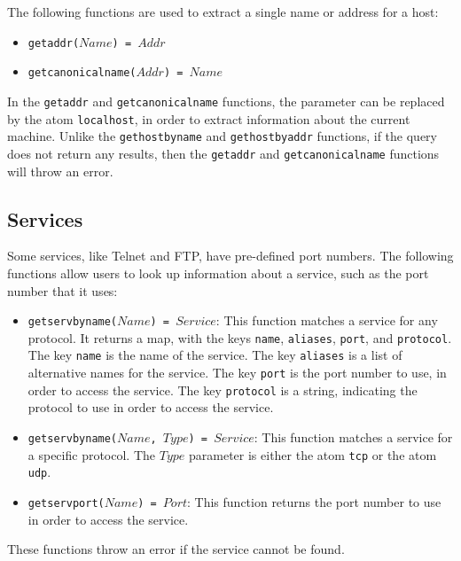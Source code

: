 The following functions are used to extract a single name or address for a host:
\begin{itemize}
\item \texttt{getaddr($Name$) = $Addr$}
\item \texttt{getcanonicalname($Addr$) = $Name$}
\end{itemize}
In the \texttt{getaddr} and \texttt{getcanonicalname} functions, the parameter can be replaced by the atom \texttt{localhost}, in order to extract information about the current machine.  Unlike the \texttt{gethostbyname} and \texttt{gethostbyaddr} functions, if the query does not return any results, then the \texttt{getaddr} and \texttt{getcanonicalname} functions will throw an error.  

\subsection{Services}
Some services, like Telnet and FTP, have pre-defined port numbers.  The following functions allow users to look up information about a service, such as the port number that it uses:
\begin{itemize}
\item \texttt{getservbyname($Name$) = $Service$}: This function matches a service for any protocol.  It returns a map, with the keys \texttt{name}, \texttt{aliases}, \texttt{port}, and \texttt{protocol}.  The key \texttt{name} is the name of the service.  The key \texttt{aliases} is a list of alternative names for the service.  The key \texttt{port} is the port number to use, in order to access the service.  The key \texttt{protocol} is a string, indicating the protocol to use in order to access the service.
\item \texttt{getservbyname($Name$, $Type$) = $Service$}: This function matches a service for a specific protocol.  The $Type$ parameter is either the atom \texttt{tcp} or the atom \texttt{udp}.
\item \texttt{getservport($Name$) = $Port$}: This function returns the port number to use in order to access the service. 
\end{itemize}
These functions throw an error if the service cannot be found.

\ignore{

}
